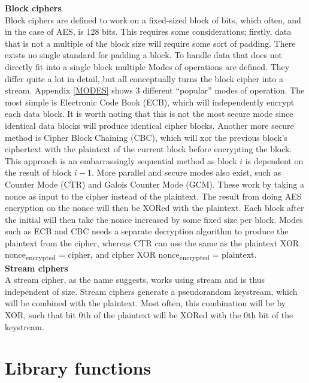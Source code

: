 \documentclass[a4paper, openany]{memoir}
\begin{document}
\begin{abstact}
\textbf{Block ciphers}\\
Block ciphers are defined to work on a fixed-sized block of bits, which often, and in the case of AES, is 128 bits. This requires some considerations; firstly, data that is not a multiple of the block size will require some sort of padding. There exists no single standard for padding a block. To handle data that does not directly fit into a single block multiple Modes of operations are defined. They differ quite a lot in detail, but all conceptually turns the block cipher into a stream. Appendix \ref{MODES} shows 3 different ``popular'' modes of operation. The most simple is Electronic Code Book (ECB), which will independently encrypt each data block. It is worth noting that this is not the most secure mode since identical data blocks will produce identical cipher blocks. Another more secure method is Cipher Block Chaining (CBC), which will xor the previous block's ciphertext with the plaintext of the current block before encrypting the block. This approach is an embarrassingly sequential method as block \(i\) is dependent on the result of block \(i-1\). More parallel and secure modes also exist, such as Counter Mode (CTR) and Galois Counter Mode (GCM). These work by taking a nonce as input to the cipher instead of the plaintext. The result from doing AES encryption on the nonce will then be XORed with the plaintext. Each block after the initial will then take the nonce increased by some fixed size per block. Modes such as ECB and CBC needs a separate decryption algorithm to produce the plaintext from the cipher, whereas CTR can use the same as the plaintext XOR nonce\textsubscript{encrypted} = cipher, and cipher XOR nonce\textsubscript{encrypted} = plaintext.\\

\textbf{Stream ciphers}\\
A stream cipher, as the name suggests, works using stream and is thus independent of size. Stream ciphers generate a pseudorandom keystream, which will be combined with the plaintext. Most often, this combination will be by XOR, such that bit 0th of the plaintext will be XORed with the 0th bit of the keystream.
\chapter{Library functions}
\label{sec:org35fe3f0}

\end{abstact}
\end{document}
